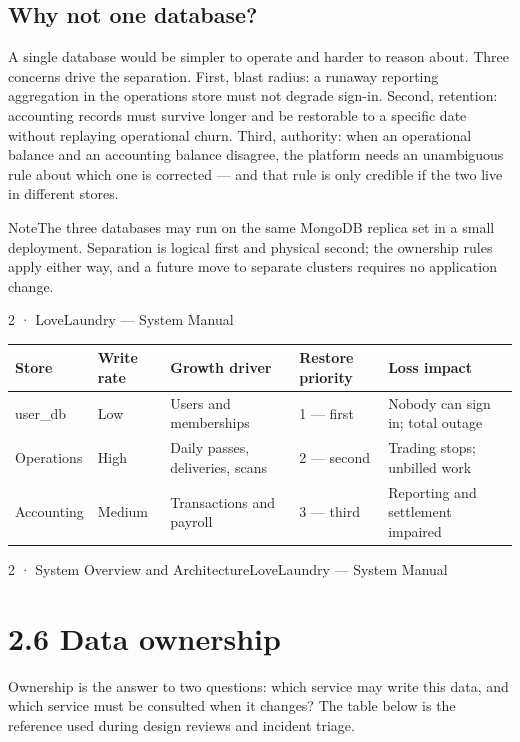 \documentclass[11pt,a4paper,oneside]{book}
\begin{document}
\subsection*{Why not one database?}
A single database would be simpler to operate and harder to reason about. Three concerns drive the separation. First, blast radius: a runaway reporting aggregation in the operations store must not degrade sign-in. Second, retention: accounting records must survive longer and be restorable to a specific date without replaying operational churn. Third, authority: when an operational balance and an accounting balance disagree, the platform needs an unambiguous rule about which one is corrected — and that rule is only credible if the two live in different stores.

\begin{notebox}NoteThe three databases may run on the same MongoDB replica set in a small deployment. Separation is logical first and physical second; the ownership rules apply either way, and a future move to separate clusters requires no application change.\end{notebox}
2 · LoveLaundry — System Manual

\begin{center}\small
\begin{tabularx}{\linewidth}{|X|X|X|X|X|}
\hline
\rowcolor{lightgrey}
\textbf{Store} & \textbf{Write rate} & \textbf{Growth driver} & \textbf{Restore priority} & \textbf{Loss impact} \\ \hline
user\_db & Low & Users and memberships & 1 — first & Nobody can sign in; total outage \\ \hline
Operations & High & Daily passes, deliveries, scans & 2 — second & Trading stops; unbilled work \\ \hline
Accounting & Medium & Transactions and payroll & 3 — third & Reporting and settlement impaired \\ \hline
\end{tabularx}
\end{center}
2 · System Overview and ArchitectureLoveLaundry — System Manual

\section{2.6 Data ownership}
Ownership is the answer to two questions: which service may write this data, and which service must be consulted when it changes? The table below is the reference used during design reviews and incident triage.
\end{document}
